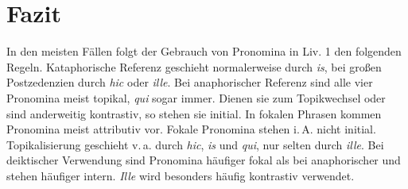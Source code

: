 \documentclass[12pt]{article}
\newcommand{\lat}[1]{\textit{#1}} %
\newcommand{\cntrl}[1]{#1} %
\begin{document}
\begin{comment} Hier kommen Gedanken zur Deixis, von denen einige falsch sind.

\section{Deixis}

Bekanntlich können \lat{hic} und \lat{ille} deiktisch verwendet werden, wie in Beispiel~\ref{perhunc}, in dem die Referenz ohne Kenntnis des Kontexts nicht entschlüsselt werden kann.
\lat{Is} gilt gemeinhin als nicht deiktisch. \footcite[Vgl.][§\,118 1\,a)]{kuehner}
\footcite[Vgl.][§\,105 d)]{szantyr}
Allerdings kommen in Liv. I sowie in vielen anderen lateinischen Werken Formulierungen wie \lat{ea tempestate} vor. \ref{eatempestate} ist ein Beispiel dafür. Es gibt kein Antezedens für \lat{ea tempestate}.

\ex.
\a.
\label{perhunc}
\lat{Brutus illis luctu occupatis, cultrum ex volnere Lucretiae extractum manante cruore prae se tenens, `Per hunc' inquit `castissimum ante regiam iniuriam sanguinem iuro, vosque, di, testes facio me L. Tarquinium Superbum} [\ldots] \lat{exsecuturum} [\ldots]\lat{'}
\trans Während jene noch trauerten, hielt das Messer, das er aus der vor Blut triefenden Wunde der Lucretia herausgezogen hatte, vor sich und sagte: \glqq Bei diesem Blute, das vor dem Unrecht des Königs das allerreinste war, schwöre ich -- und euch, Götter, rufe ich als Zeugen an --, dass ich Lucius Tarquinius Superbus [\ldots] verfolgen werde [\ldots] \grqq

\end{comment}

\section{Fazit}

In den meisten Fällen folgt der Gebrauch von Pronomina in Liv. 1 den folgenden Regeln.
Kataphorische Referenz geschieht normalerweise durch \lat{is}, bei großen Postzedenzien durch \lat{hic} oder \lat{ille}.
Bei anaphorischer Referenz sind alle vier Pronomina meist topikal, \lat{qui} sogar immer.
Dienen sie zum Topikwechsel oder sind anderweitig kontrastiv, so stehen sie initial.
In fokalen Phrasen kommen Pronomina meist attributiv vor.
Fokale Pronomina stehen i.\,A. nicht initial.
Topikalisierung geschieht v.\,a. durch \lat{hic}, \lat{is} und \lat{qui}, nur selten durch \lat{ille}.
Bei deiktischer Verwendung sind Pronomina häufiger fokal als bei anaphorischer und stehen häufiger intern.
\lat{Ille} wird besonders häufig kontrastiv verwendet.







\newpage %


\nocite{*}
\printbibheading
\printbibliography[keyword=primary,title={Primärliteratur}]
\printbibliography[keyword=secondary,title={Sekundärliteratur}]
\end{document}
